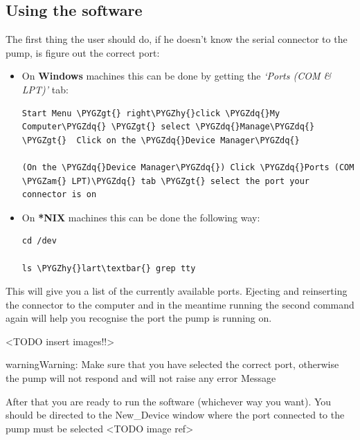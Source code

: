 \documentclass[letterpaper,10pt,english]{sphinxmanual}
\def\PYGZam{\char`\&}
\def\PYGZgt{\char`\>}
\def\PYGZhy{\char`\-}
\def\PYGZdq{\char`\"}
\begin{document}
\subsection{Using the software}
\label{installation:using-the-software}
The first thing the user should do, if he doesn't know the serial connector
to the pump, is figure out the correct port:
\begin{itemize}
\item {} 
On \textbf{Windows} machines this can be done by getting the \emph{`Ports (COM \& LPT)'} tab:

\begin{Verbatim}[commandchars=\\\{\}]
Start Menu \PYGZgt{} right\PYGZhy{}click \PYGZdq{}My Computer\PYGZdq{} \PYGZgt{} select \PYGZdq{}Manage\PYGZdq{} \PYGZgt{}  Click on the \PYGZdq{}Device Manager\PYGZdq{}

(On the \PYGZdq{}Device Manager\PYGZdq{}) Click \PYGZdq{}Ports (COM \PYGZam{} LPT)\PYGZdq{} tab \PYGZgt{} select the port your connector is on
\end{Verbatim}

\item {} 
On \textbf{*NIX} machines this can be done the following way:

\begin{Verbatim}[commandchars=\\\{\}]
cd /dev

ls \PYGZhy{}lart\textbar{} grep tty
\end{Verbatim}

\end{itemize}

This will give  you a list of the currently available ports. Ejecting and reinserting the connector
to the computer and in the meantime running the second command again will help you recognise
the port the pump is running on.

\textless{}TODO insert images!!\textgreater{}

\begin{notice}{warning}{Warning:}
Make sure that you have selected the correct port, otherwise the pump will not respond and will
not raise any error Message
\end{notice}

After that you are ready to run the software (whichever way you want). You should be directed to the New\_Device window where the
port connected to the pump must be selected \textless{}TODO image ref\textgreater{}
\end{document}
